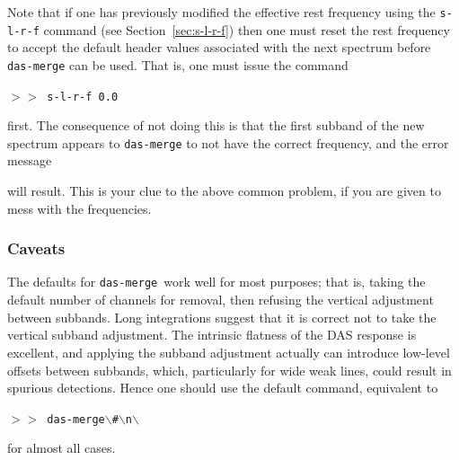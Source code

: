 \documentclass[11pt,twoside]{starlink}
\providecommand{\dm}{\texttt{das-merge}}
\providecommand{\SP}{{$>\!>$}}
\begin{document}
Note that if one has previously modified the effective rest frequency
using the \texttt{s-l-r-f} command (see Section~\ref{sec:s-l-r-f}) then one
must reset the rest frequency
to accept the default header values associated with the next spectrum
before \texttt{das-merge} can be used. That is, one must issue the
command

\SP\ \texttt{s-l-r-f 0.0}

first. The consequence of not doing this is that the first subband
of the new spectrum appears to \texttt{das-merge} to not have the correct
frequency, and the error message


will result. This is your clue to the above common problem, if you
are given to mess with the frequencies.

\subsubsection{Caveats}
The defaults for \dm\ work well for most purposes; that is, taking the
default number of channels for removal, then refusing the vertical
adjustment between subbands. Long integrations suggest that it
is correct not to take the vertical subband adjustment.  The intrinsic
flatness of the DAS response is excellent, and applying the subband
adjustment actually can introduce low-level offsets between subbands,
which, particularly for wide weak lines, could result in spurious
detections.  Hence one should use the default command, equivalent to

\SP\ \texttt{das-merge$\backslash$\#$\backslash$n$\backslash$}

for almost all cases.
\end{document}
